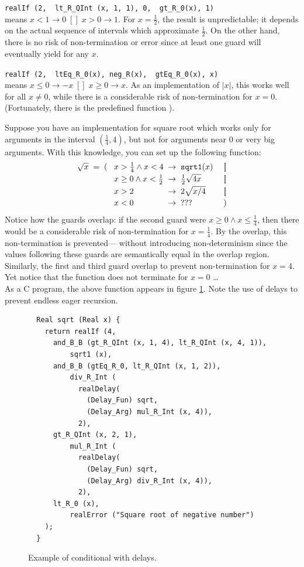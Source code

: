 \documentclass[a4paper,12pt]{article}
\begin{document}
\verb|realIf (2,  lt_R_QInt (x, 1, 1), 0,  gt_R_0(x), 1)|\\[0.3ex]
means  $x < 1 \to 0 \;[\!]\; x > 0 \to 1$.
For $x = \frac12$, the result is unpredictable;
it depends on the actual sequence of intervals
which approximate $\frac12$.
On the other hand, there is no risk of non-termination or error
since at least one guard will eventually yield  
for any $x$.

\verb|realIf (2,  ltEq_R_0(x), neg_R(x),  gtEq_R_0(x), x)|\\[0.3ex]
means  $x \leq 0 \to -x \;[\!]\; x \geq 0 \to x$.
As an implementation of $|x|$, this works well for all $x \neq 0$,
while there is a considerable risk of non-termination for $x = 0$.
(Fortunately, there is the predefined function ).

Suppose you have an implementation  for square root
which works only for arguments in the interval $(\frac14,4)$,
but not for arguments near 0 or very big arguments.
With this knowledge, you can set up the following function:
\[ \begin{array}{ r l @{\;\;\to\;\;} l l }
 \sqrt{x} \;=\; (\! & x > \frac14 \land x < 4    & \Name{sqrt1}(x)   & \;[\!] \\[0.5ex]
                    & x \geq 0 \land x < \frac12 & \frac12 \sqrt{4x} & \;[\!] \\[0.5ex]
                    & x > 2                      & 2 \sqrt{x/4}      & \;[\!] \\[0.5ex]
                    & x < 0                      & ???               & \;)
   \end{array}
\]
Notice how the guards overlap:
if the second guard were $x \geq 0 \land x \leq \frac14$,
then there would be a considerable risk of non-termination
for $x = \frac14$.
By the overlap, this non-termination is prevented---%
without introducing non-determinism
since the values following these guards
are semantically equal in the overlap region.
Similarly, the first and third guard overlap
to prevent non-termination for $x = 4$.
Yet notice that the function does not terminate for $x = 0$ \ldots\\[0.5ex]
As a C program, the above function appears in figure \ref{fig:conditionals}.
Note the use of delays to prevent endless eager recursion.

\begin{figure}[htp]
\begin{verbatim}
  Real sqrt (Real x) {
    return realIf (4,
      and_B_B (gt_R_QInt (x, 1, 4), lt_R_QInt (x, 4, 1)),
          sqrt1 (x),
      and_B_B (gtEq_R_0, lt_R_QInt (x, 1, 2)),
          div_R_Int (
            realDelay(
              (Delay_Fun) sqrt,
              (Delay_Arg) mul_R_Int (x, 4)),
            2),
      gt_R_QInt (x, 2, 1),
          mul_R_Int (
            realDelay(
              (Delay_Fun) sqrt,
              (Delay_Arg) div_R_Int (x, 4)),
            2),
      lt_R_0 (x),
          realError ("Square root of negative number")
    );
  }
\end{verbatim}
\caption{Example of conditional with delays.}\label{fig:conditionals}
\end{figure}
\end{document}
